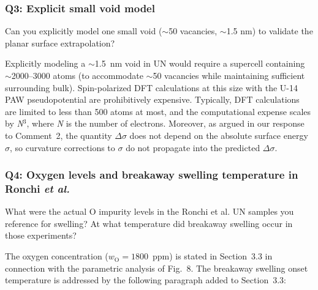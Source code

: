 \documentclass[12pt]{article}
\begin{document}
\color{black}

\subsubsection*{Q3: Explicit small void model}

\color{blue}
Can you explicitly model one small void ($\sim$50 vacancies, $\sim$1.5 nm) to validate the planar surface extrapolation?\\
\color{black}


Explicitly modeling a $\sim$1.5~nm void in UN would require a supercell containing $\sim$2000--3000 atoms (to accommodate $\sim$50 vacancies while maintaining sufficient surrounding bulk). Spin-polarized DFT calculations at this size with the U-14 PAW pseudopotential are prohibitively expensive. Typically, DFT calculations are limited to less than 500 atoms at most, and the computational expense scales by \textit{N}$^3$, where \textit{N} is the number of electrons. Moreover, as argued in our response to Comment~2, the quantity $\Delta \sigma$ does not depend on the absolute surface energy $\sigma$, so curvature corrections to $\sigma$ do not propagate into the predicted $\Delta \sigma$.


\subsubsection*{Q4: Oxygen levels and breakaway swelling temperature in Ronchi \textit{et al.}}

\color{blue}
What were the actual O impurity levels in the Ronchi et al. UN samples you reference for swelling? At what temperature did breakaway swelling occur in those experiments? \\

\color{black}


The oxygen concentration ($w_\text{O} = 1800$~ppm) is stated in Section~3.3 in connection with the parametric analysis of Fig.~8. The breakaway swelling onset temperature is addressed by the following paragraph added to Section~3.3:
\end{document}
